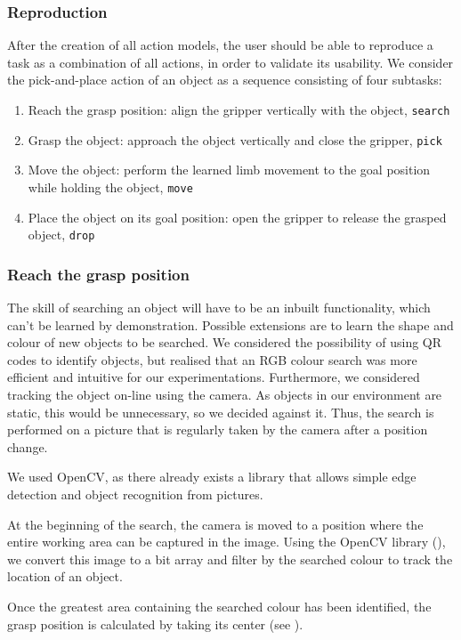 \subsubsection{Reproduction}
After the creation of all action models, the user should be able to reproduce a task as a combination of all actions, in order to validate its usability.
We consider the pick-and-place action of an object as a sequence consisting of four subtasks:
\begin{enumerate}
	\item Reach the grasp position: align the gripper vertically with the object, \ie
	\texttt{search}
	\item Grasp the object: approach the object vertically and close the gripper, \ie
	\texttt{pick}
	\item Move the object: perform the learned limb movement to the goal position while holding the object, \ie
	\texttt{move}
	\item Place the object on its goal position: open the gripper to release the grasped object, \ie
	\texttt{drop}
\end{enumerate}

\subsubsection{Reach the grasp position}\label{Object Search}
The skill of searching an object will have to be an inbuilt functionality, which can't be learned by demonstration.
Possible extensions are to learn the shape and colour of new objects to be searched.
We considered the possibility of using QR codes to identify objects, but realised that an RGB colour search was more efficient and intuitive for our experimentations.
Furthermore, we considered tracking the object on-line using the camera.
As objects in our environment are static, this would be unnecessary, so we decided against it.
Thus, the search is performed on a picture that is regularly taken by the camera after a position change.

We used OpenCV, as there already exists a library that allows simple edge detection and object recognition from pictures.

At the beginning of the search, the camera is moved to a position where the entire working area can be captured in the image.
Using the OpenCV library (\cite{opencv}), we convert this image to a bit array and filter by the searched colour to track the location of an object.

Once the greatest area containing the searched colour has been identified, the grasp position is calculated by taking its center (see ).

